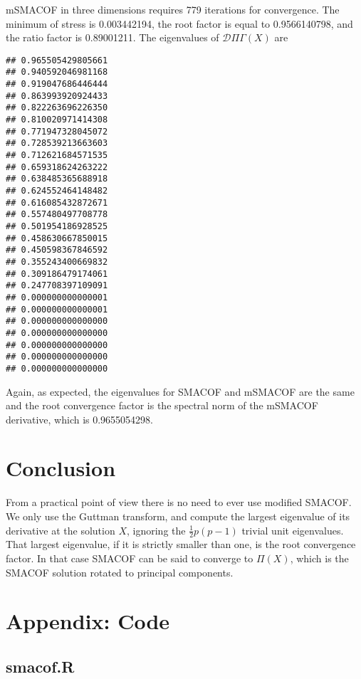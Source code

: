\documentclass[
  12pt,
]{article}
\begin{document}
mSMACOF in three dimensions requires 779 iterations for convergence. The minimum of stress is 0.003442194,
the root factor is equal to 0.9566140798, and the ratio factor is 0.89001211. The eigenvalues of \(\mathcal{D}\Pi\Gamma(X)\) are

\begin{verbatim}
## 0.965505429805661 
## 0.940592046981168 
## 0.919047686446444 
## 0.863993920924433 
## 0.822263696226350 
## 0.810020971414308 
## 0.771947328045072 
## 0.728539213663603 
## 0.712621684571535 
## 0.659318624263222 
## 0.638485365688918 
## 0.624552464148482 
## 0.616085432872671 
## 0.557480497708778 
## 0.501954186928525 
## 0.458630667850015 
## 0.450598367846592 
## 0.355243400669832 
## 0.309186479174061 
## 0.247708397109091 
## 0.000000000000001 
## 0.000000000000001 
## 0.000000000000000 
## 0.000000000000000 
## 0.000000000000000 
## 0.000000000000000 
## 0.000000000000000
\end{verbatim}

Again, as expected, the eigenvalues for SMACOF and mSMACOF are the same and the root convergence factor is the spectral norm of the mSMACOF derivative, which is 0.9655054298.

\section{Conclusion}\label{conclusion}

From a practical point of view there is no need to ever use modified SMACOF. We only use the Guttman transform, and compute the largest eigenvalue of its derivative at the solution \(X\), ignoring the \(\frac12 p(p-1)\) trivial unit eigenvalues. That largest eigenvalue, if it is strictly smaller than one, is the root convergence factor. In that case SMACOF can be said to converge to \(\Pi(X)\), which is the SMACOF solution rotated to principal components.

\section{Appendix: Code}\label{appendix-code}

\subsection{smacof.R}\label{smacof.r}
\end{document}

